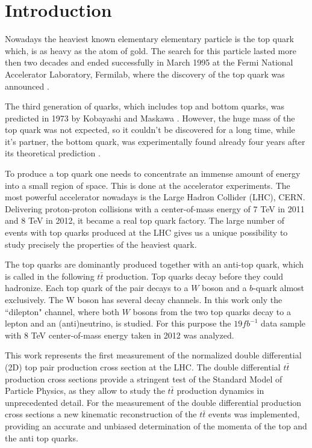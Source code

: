\chapter{Introduction}

Nowadays the heaviest known elementary elementary particle is the top quark which, is as heavy as the atom of gold. 
The search for this particle lasted more then two decades and ended successfully 
in March 1995 at the Fermi National Accelerator Laboratory, Fermilab, where 
the discovery of the top quark was announced \cite{PhysRevLett.74.2626}. 

The third generation of quarks, which includes top and bottom quarks, 
was predicted in 1973 by Kobayashi and Maskawa \cite{Kobayashi:1973fv}. However, the huge mass of the 
top quark was not expected, so it couldn't be discovered for a long time, while it's partner, 
the bottom quark, was experimentally found already four years after its theoretical prediction \cite{PhysRevLett.39.252}. 

To produce a top quark one needs to concentrate an immense amount of energy 
into a small region of space. This is done at the accelerator experiments. 
The most powerful accelerator nowadays is the Large Hadron Collider (LHC), CERN. 
Delivering proton-proton collisions with a center-of-mass energy of 7 TeV in 2011 and 8 TeV in 2012, 
it became a real top quark factory. The large number of events with top quarks
produced at the LHC gives us a unique possibility to study precisely the properties of the heaviest quark. 

The top quarks are dominantly produced together with an anti-top quark, which is called in the 
following $t\bar{t}$ production. Top quarks decay before they could hadronize. 
Each top quark of the pair decays to a $W$ boson and a $b$-quark almost exclusively. 
The W boson has several decay channels. In this work only the ``dilepton" channel, 
where both $W$ bosons from the two top quarks decay to a lepton and an (anti)neutrino, is studied. 
For this purpose the $19 fb^{-1}$ data sample with 8 TeV center-of-mass energy taken in 2012 was analyzed.

This work represents the first measurement of the normalized double differential (2D) top pair production
cross section at the LHC. The double differential $t\bar{t}$ production cross sections provide a stringent test of the 
Standard Model of Particle Physics, as they allow to study the $t\bar{t}$ production dynamics in unprecedented
detail. For the measurement of the double differential production cross sections a new kinematic reconstruction
of the $t\bar{t}$ events was implemented, providing an accurate and unbiased determination of the momenta of the
top and the anti top quarks.

